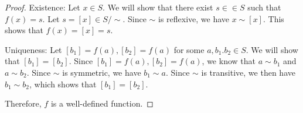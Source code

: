 \documentclass{article}
\begin{document}
\begin{enumerate}
\begin{proof}
    Existence: Let $x \in S$. We will show that there exist $s \in \in S$ such that $f(x) = s$. Let $s = [x] \in S / \sim$. Since $\sim$ is reflexive, we have $x \sim [x]$. This shows that $f(x) = [x] = s$. 

    Uniqueness: Let $[b_1] = f(a), [b_2] = f(a)$ for some $a, b_1. b_2 \in S$. We will show that $[b_1] = [b_2]$. Since $[b_1] = f(a), [b_2] = f(a)$, we know that $a \sim b_1$ and $a \sim b_2$. Since $\sim$ is symmetric, we have $b_1 \sim a$. Since $\sim$ is transitive, we then have $b_1 \sim b_2$, which shows that $[b_1] = [b_2]$.

    Therefore, $f$ is a well-defined function.
\end{proof}
    
\end{enumerate}
\end{document}
